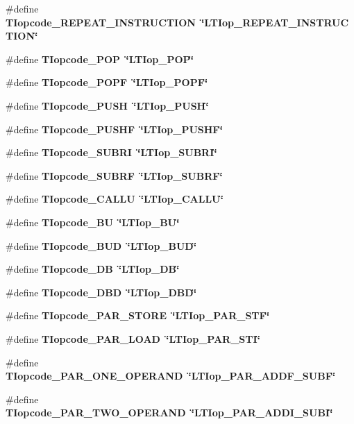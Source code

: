 \begin{CompactItemize}
\item 
\#define \bf{TIopcode\_\-REPEAT\_\-INSTRUCTION}~\char`\"{}LTIop\_\-REPEAT\_\-INSTRUCTION\char`\"{}
\item 
\#define \bf{TIopcode\_\-POP}~\char`\"{}LTIop\_\-POP\char`\"{}
\item 
\#define \bf{TIopcode\_\-POPF}~\char`\"{}LTIop\_\-POPF\char`\"{}
\item 
\#define \bf{TIopcode\_\-PUSH}~\char`\"{}LTIop\_\-PUSH\char`\"{}
\item 
\#define \bf{TIopcode\_\-PUSHF}~\char`\"{}LTIop\_\-PUSHF\char`\"{}
\item 
\#define \bf{TIopcode\_\-SUBRI}~\char`\"{}LTIop\_\-SUBRI\char`\"{}
\item 
\#define \bf{TIopcode\_\-SUBRF}~\char`\"{}LTIop\_\-SUBRF\char`\"{}
\item 
\#define \bf{TIopcode\_\-CALLU}~\char`\"{}LTIop\_\-CALLU\char`\"{}
\item 
\#define \bf{TIopcode\_\-BU}~\char`\"{}LTIop\_\-BU\char`\"{}
\item 
\#define \bf{TIopcode\_\-BUD}~\char`\"{}LTIop\_\-BUD\char`\"{}
\item 
\#define \bf{TIopcode\_\-DB}~\char`\"{}LTIop\_\-DB\char`\"{}
\item 
\#define \bf{TIopcode\_\-DBD}~\char`\"{}LTIop\_\-DBD\char`\"{}
\item 
\#define \bf{TIopcode\_\-PAR\_\-STORE}~\char`\"{}LTIop\_\-PAR\_\-STF\char`\"{}
\item 
\#define \bf{TIopcode\_\-PAR\_\-LOAD}~\char`\"{}LTIop\_\-PAR\_\-STI\char`\"{}
\item 
\#define \bf{TIopcode\_\-PAR\_\-ONE\_\-OPERAND}~\char`\"{}LTIop\_\-PAR\_\-ADDF\_\-SUBF\char`\"{}
\item 
\#define \bf{TIopcode\_\-PAR\_\-TWO\_\-OPERAND}~\char`\"{}LTIop\_\-PAR\_\-ADDI\_\-SUBI\char`\"{}
\end{CompactItemize}

